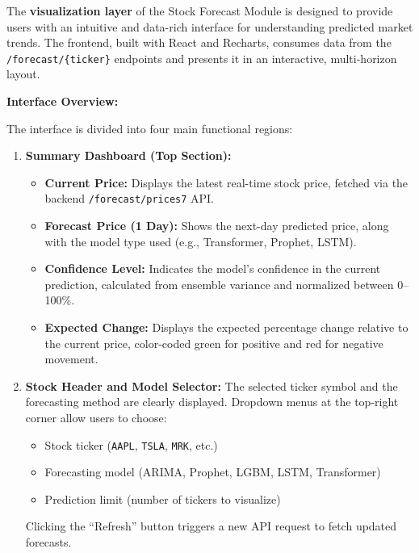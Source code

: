 The \textbf{visualization layer} of the Stock Forecast Module is designed to provide users with an intuitive and data-rich interface for understanding predicted market trends. The frontend, built with React and Recharts, consumes data from the \texttt{/forecast/\{ticker\}} endpoints and presents it in an interactive, multi-horizon layout.


\textbf{Interface Overview:}

The interface is divided into four main functional regions:

\begin{enumerate}
\item \textbf{Summary Dashboard (Top Section):}
  \begin{itemize}
  \item \textbf{Current Price:} Displays the latest real-time stock price, fetched via the backend \texttt{/forecast/prices7} API.
  \item \textbf{Forecast Price (1 Day):} Shows the next-day predicted price, along with the model type used (e.g., Transformer, Prophet, LSTM).
  \item \textbf{Confidence Level:} Indicates the model's confidence in the current prediction, calculated from ensemble variance and normalized between 0--100\%.
  \item \textbf{Expected Change:} Displays the expected percentage change relative to the current price, color-coded green for positive and red for negative movement.
  \end{itemize}

\item \textbf{Stock Header and Model Selector:}
  The selected ticker symbol and the forecasting method are clearly displayed. Dropdown menus at the top-right corner allow users to choose:
  \begin{itemize}
  \item Stock ticker (\texttt{AAPL}, \texttt{TSLA}, \texttt{MRK}, etc.)
  \item Forecasting model (ARIMA, Prophet, LGBM, LSTM, Transformer)
  \item Prediction limit (number of tickers to visualize)
  \end{itemize}
  Clicking the “Refresh” button triggers a new API request to fetch updated forecasts.


\end{enumerate}
